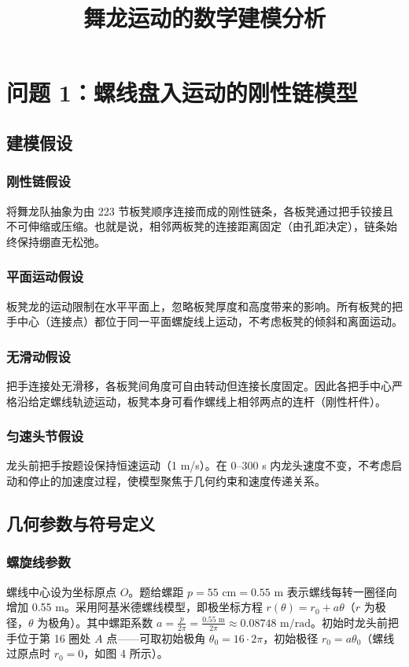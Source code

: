 \documentclass[UTF8]{ctexart}
\title{舞龙运动的数学建模分析}
\author{}
\date{}
\begin{document}
\maketitle
\tableofcontents
\newpage

\section{问题 1：螺线盘入运动的刚性链模型}

\subsection{建模假设}

\subsubsection{刚性链假设}
将舞龙队抽象为由 223 节板凳顺序连接而成的刚性链条，各板凳通过把手铰接且不可伸缩或压缩。也就是说，相邻两板凳的连接距离固定（由孔距决定），链条始终保持绷直无松弛。

\subsubsection{平面运动假设}
板凳龙的运动限制在水平平面上，忽略板凳厚度和高度带来的影响。所有板凳的把手中心（连接点）都位于同一平面螺旋线上运动，不考虑板凳的倾斜和离面运动。

\subsubsection{无滑动假设}
把手连接处无滑移，各板凳间角度可自由转动但连接长度固定。因此各把手中心严格沿给定螺线轨迹运动，板凳本身可看作螺线上相邻两点的连杆（刚性杆件）。

\subsubsection{匀速头节假设}
龙头前把手按题设保持恒速运动（1 m/s）。在 0–300 s 内龙头速度不变，不考虑启动和停止的加速度过程，使模型聚焦于几何约束和速度传递关系。

\subsection{几何参数与符号定义}

\subsubsection{螺旋线参数}
螺线中心设为坐标原点 $O$。题给螺距 $p=55\text{ cm}=0.55\text{ m}$ 表示螺线每转一圈径向增加 0.55 m。采用阿基米德螺线模型，即极坐标方程 $r(\theta)=r_0 + a\theta$（$r$ 为极径，$\theta$ 为极角）。其中螺距系数 $a=\frac{p}{2\pi}= \frac{0.55\text{ m}}{2\pi}\approx0.08748\text{ m/rad}$。初始时龙头前把手位于第 16 圈处 $A$ 点——可取初始极角 $\theta_0=16 \cdot 2\pi$，初始极径 $r_0=a\theta_0$（螺线过原点时 $r_0=0$，如图 4 所示）。
\end{document}
